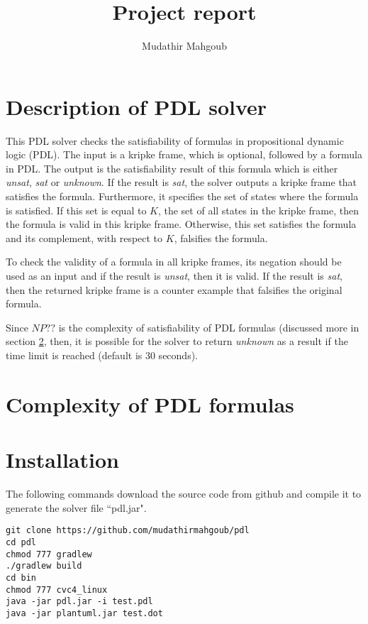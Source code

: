 \documentclass[12pt,a4paper]{article}
\author{Mudathir Mahgoub}
\title{Project report}
\begin{document}
\maketitle

\section{Description of PDL solver}
This PDL solver checks the satisfiability of formulas in propositional dynamic logic (PDL).
The input is a kripke frame, which is optional, followed by a formula in PDL. The output is the satisfiability result of this formula which is either \textit{unsat}, \textit{sat} or \textit{unknown}. If the result is \textit{sat}, the solver outputs a kripke frame that satisfies the formula. Furthermore, it specifies the set of states where the formula is satisfied. If this set is equal to $K$, the set of all states in the kripke frame, then the formula is valid in this kripke frame. Otherwise, this set satisfies the formula and its complement, with respect to $K$, falsifies the formula. 

To check the validity of a formula in all kripke frames, its negation should be used as an input and if the result is \textit{unsat}, then it is valid. If the result is \textit{sat}, then the returned kripke frame is a counter example that falsifies the original formula.

Since $NP??$ is the complexity of satisfiability of PDL formulas (discussed more in section \ref{sec:complexity}, then, it is possible for the solver to return \textit{unknown} as a result if the time limit is reached (default is 30 seconds). 
\section{Complexity of PDL formulas} \label{sec:complexity}

\section{Installation}

The following commands download the source code from github and compile it to generate the solver file ``pdl.jar". 

\begin{verbatim}
git clone https://github.com/mudathirmahgoub/pdl
cd pdl
chmod 777 gradlew
./gradlew build
cd bin
chmod 777 cvc4_linux
java -jar pdl.jar -i test.pdl 
java -jar plantuml.jar test.dot
\end{verbatim}
\end{document}
